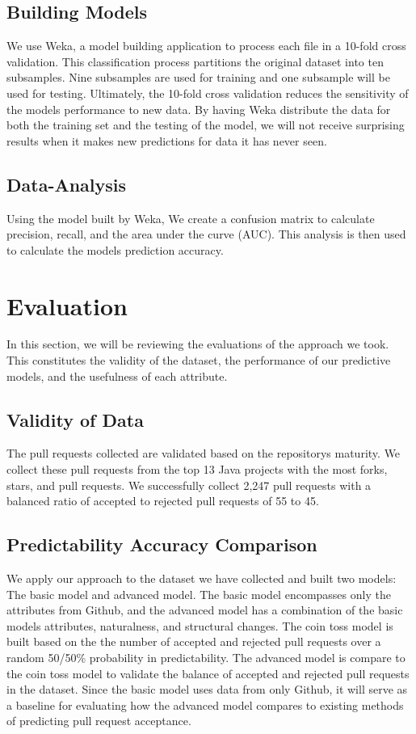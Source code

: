 \documentclass[10pt, conference]{IEEEtran}
\begin{document}
\subsection{Building Models}
We use Weka, a model building application to process each file in a 10-fold cross validation. This classification process partitions the original dataset into ten subsamples. Nine subsamples are used for training and one subsample will be used for testing. Ultimately, the 10-fold cross validation reduces the sensitivity of the model\textquotesingle s performance to new data. By having Weka distribute the data for both the training set and the testing of the model, we will not receive surprising results when it makes new predictions for data it has never seen.

\subsection{Data-Analysis}
Using the model built by Weka, We create a confusion matrix to calculate precision, recall, and the area under the curve (AUC). This analysis is then used to calculate the model\textquotesingle s prediction accuracy.

\section{Evaluation}
\label{evaluation}
In this section, we will be reviewing the evaluations of the approach we took. This constitutes the validity of the dataset, the performance of our predictive models, and the usefulness of each attribute.

\subsection{Validity of Data}
The pull requests collected are validated based on the repository\textquotesingle s maturity. We collect these pull requests from the top 13 Java projects with the most forks, stars, and pull requests. We successfully collect 2,247 pull requests with a balanced ratio of accepted to rejected pull requests of 55 to 45.

\subsection{Predictability Accuracy Comparison}
We apply our approach to the dataset we have collected and built two models: The basic model and advanced model. The basic model encompasses only the attributes from Github, and the advanced model has a combination of the basic model\textquotesingle s attributes, naturalness, and structural changes. The coin toss model is built based on the the number of accepted and rejected pull requests over a random 50/50\% probability in predictability. The advanced model is compare to the coin toss model to validate the balance of accepted and rejected pull requests in the dataset. Since the basic model uses data from only Github, it will serve as a baseline for evaluating how the advanced model compares to existing methods of predicting pull request acceptance.
\end{document}
